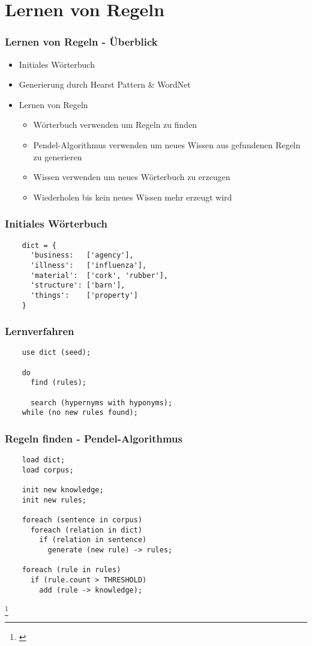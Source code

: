 \section{Lernen von Regeln}
\label{sec:itteratives-lernen}

\begin{frame}
  \frametitle{Lernen von Regeln - Überblick}

  \begin{itemize}
  \item Initiales Wörterbuch
  \item Generierung durch Hearst Pattern \& WordNet
  \item Lernen von Regeln
    \begin{itemize}
    \item Wörterbuch verwenden um Regeln zu finden
    \item Pendel-Algorithmus verwenden um neues Wissen aus gefundenen
      Regeln zu generieren \cite{Biemann:2003}
    \item Wissen verwenden um neues Wörterbuch zu erzeugen
    \item Wiederholen bis kein neues Wissen mehr erzeugt wird
    \end{itemize}
  \end{itemize}
\end{frame}

\begin{frame}[fragile]
  \frametitle{Initiales Wörterbuch}

  \begin{lstlisting}
    dict = {
      'business:   ['agency'],
      'illness':   ['influenza'],
      'material':  ['cork', 'rubber'],
      'structure': ['barn'],
      'things':    ['property']
    }
  \end{lstlisting}
\end{frame}

\begin{frame}[fragile]
  \frametitle{Lernverfahren}

  \begin{lstlisting}
    use dict (seed);

    do
      find (rules);

      search (hypernyms with hyponyms);
    while (no new rules found);
  \end{lstlisting}
\end{frame}

\begin{frame}[fragile]
  \frametitle{Regeln finden - Pendel-Algorithmus}

  \begin{lstlisting}
    load dict;
    load corpus;
    
    init new knowledge;
    init new rules;

    foreach (sentence in corpus)
      foreach (relation in dict)
        if (relation in sentence)
          generate (new rule) -> rules;

    foreach (rule in rules)
      if (rule.count > THRESHOLD)
        add (rule -> knowledge);
  \end{lstlisting}

  \let\thefootnote\relax\footnote{\cite{Biemann:2003}}
\end{frame}

